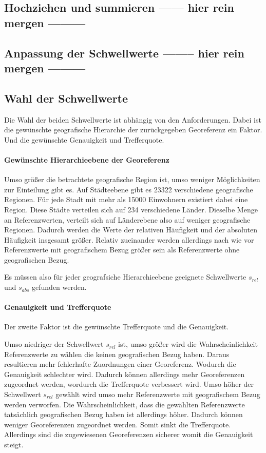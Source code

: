 		\subsection{Hochziehen und summieren ------ hier rein mergen ---------}

		\subsection{Anpassung der Schwellwerte -------- hier rein mergen ---------}

		\subsection{Wahl der Schwellwerte}

			Die Wahl der beiden Schwellwerte ist abhängig von den Anforderungen.
			Dabei ist die gewünschte geografische Hierarchie der zurückgegeben Georeferenz ein Faktor.
			Und die gewünschte Genauigkeit und Trefferquote.
			
			\paragraph{Gewünschte Hierarchieebene der Georeferenz}

				Umso größer die betrachtete geografische Region ist, umso weniger Möglichkeiten zur Einteilung gibt es.
				Auf Städteebene gibt es 23322 verschiedene geografische Regionen. 
				Für jede Stadt mit mehr als 15000 Einwohnern existiert dabei eine Region.
				Diese Städte verteilen sich auf 234 verschiedene Länder.
				Dieselbe Menge an Referenzwerten, verteilt sich auf Länderebene also auf weniger geografische Regionen. 
				Dadurch werden die Werte der relativen Häufigkeit und der absoluten Häufigkeit insgesamt größer.
				Relativ zueinander werden allerdings nach wie vor Referenzwerte mit geografischem Bezug größer sein als Referenzwerte ohne geografischen Bezug.

				Es müssen also für jeder geografsiche Hierarchieebene geeignete Schwellwerte $s_{rel}$ und $s_{abs}$ gefunden werden.

			\paragraph{Genauigkeit und Trefferquote} 

				Der zweite Faktor ist die gewünschte Trefferquote und die Genauigkeit.

				Umso niedriger der Schwellwert $s_{rel}$ ist, umso größer wird die Wahrscheinlichkeit Referenzwerte zu wählen die keinen geografischen Bezug haben.
				Daraus resultieren mehr fehlerhafte Zuordnungen einer Georeferenz.
				Wodurch die Genauigkeit schlechter wird.
				Dadurch können allerdings mehr Georeferenzen zugeordnet werden, wordurch die Trefferquote verbessert wird.
				Umso höher der Schwellwert $s_{rel}$ gewählt wird umso mehr Referenzwerte mit geografischem Bezug werden verworfen.
				Die Wahrscheinlichkeit, dass die gewählten Referenzwerte tatsächlich geografischen Bezug haben ist allerdings höher.
				Dadurch können weniger Georeferenzen zugeordnet werden.
				Somit sinkt die Trefferquote.
				Allerdings sind die zugewiesenen Georeferenzen sicherer womit die Genauigkeit steigt.

